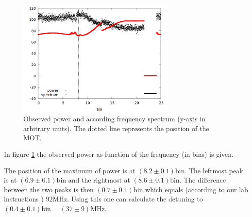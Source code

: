 \begin{figure}
\centering
\includegraphics[width=0.7\textwidth]{data/oszi.png}
\caption{Observed power and according frequency spectrum (y-axis in arbitrary units). The dotted line represents the position of the MOT.}
\label{fig:oszi}
\end{figure}

In figure \ref{fig:oszi} the observed power as function of the frequency (in bins) is given.

The position of the maximum of power is at $(8.2 \pm 0.1) \mathrm{bin}$. The leftmost peak is at $(6.9 \pm 0.1) \mathrm{bin}$ and the rightmost at $(8.6 \pm 0.1) \mathrm{bin}$. The difference between the two peaks is then $(0.7 \pm 0.1) \mathrm{bin}$ which equals (according to our lab instructions \cite{material_tutor}) $92 \si{\mega \hertz}$. Using this one can calculate the detuning to $(0.4 \pm 0.1) \mathrm{bin} = (37 \pm 9)\si{\mega \hertz}$. 

